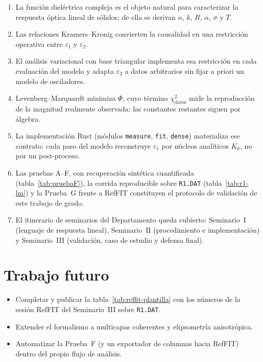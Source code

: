 \begin{enumerate}[leftmargin=*]
\item La funci\'on diel\'ectrica compleja es el objeto natural para caracterizar la respuesta \'optica lineal de s\'olidos; de ella se derivan $n$, $k$, $R$, $\alpha$, $\sigma$ y $T$.
\item Las relaciones Kramers--Kronig convierten la causalidad en una restricci\'on operativa entre $\varepsilon_1$ y $\varepsilon_2$.
\item El an\'alisis variacional con base triangular implementa esa restricci\'on en cada evaluaci\'on del modelo y adapta $\varepsilon_2$ a datos arbitrarios sin fijar a priori un modelo de osciladores.
\item Levenberg--Marquardt minimiza $\Phi$, cuyo t\'ermino $\chi^{2}_{\mathrm{datos}}$ mide la reproducci\'on de la magnitud realmente observada; las constantes restantes siguen por \'algebra.
\item La implementaci\'on Rust (m\'odulos \texttt{measure}, \texttt{fit}, \texttt{dense}) materializa ese contrato: cada paso del modelo reconstruye $\varepsilon_1$ por n\'ucleos anal\'iticos $K_k$, no por un post-proceso.
\item Las pruebas A--F, con recuperaci\'on sint\'etica cuantificada (tabla~\ref{tab:pruebaF}), la corrida reproducible sobre \texttt{R1.DAT} (tabla~\ref{tab:r1-lm}) y la Prueba~G frente a RefFIT constituyen el protocolo de validaci\'on de este trabajo de grado.
\item El itinerario de seminarios del Departamento queda cubierto: Seminario~I (lenguaje de respuesta lineal), Seminario~II (procedimiento e implementaci\'on) y Seminario~III (validaci\'on, caso de estudio y defensa final).
\end{enumerate}

\section*{Trabajo futuro}

\begin{itemize}[leftmargin=*]
\item Completar y publicar la tabla~\ref{tab:reffit-plantilla} con los n\'umeros de la sesi\'on RefFIT del Seminario~III sobre \texttt{R1.DAT}.
\item Extender el formalismo a multicapas coherentes y elipsometr\'ia anisotr\'opica.
\item Automatizar la Prueba~F (y un exportador de columnas hacia RefFIT) dentro del propio flujo de an\'alisis.
\end{itemize}


